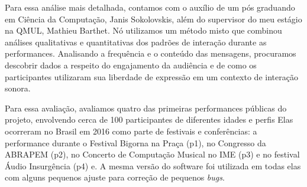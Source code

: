 Para essa análise mais detalhada, contamos com o auxílio de um pós graduando em Ciência da Computação, Janis Sokolovskis, além do supervisor do meu estágio na QMUL, Mathieu Barthet. Nó utilizamos um método misto que combinou análises qualitativas e quantitativas dos padrões de interação durante as performances. Analisando a frequência e o conteúdo das mensagens, procuramos descobrir dados a respeito do engajamento da audiência e de como os participantes utilizaram sua liberdade de expressão em um contexto de interação sonora. 


Para essa avaliação, avaliamos quatro das primeiras performances públicas do projeto, envolvendo cerca de 100 participantes de diferentes idades e perfis Elas ocorreram no Brasil em 2016 como parte de festivais e conferências: a performance durante o Festival Bigorna na Praça (p1), no Congresso da ABRAPEM (p2), no Concerto de Computação Musical no IME (p3) e no festival Áudio Insurgência (p4) e. A mesma versão do software foi utilizada em todas elas com alguns pequenos ajuste para correção de pequenos \emph{bugs}.








